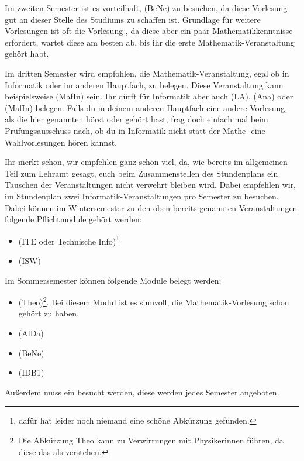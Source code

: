 Im zweiten Semester ist es vorteilhaft,  (\gls{BeNe}) zu besuchen, da diese Vorlesung gut an dieser Stelle des Studiums zu schaffen ist. Grundlage für weitere Vorlesungen ist oft die Vorlesung , da diese aber ein paar Mathematikkenntnisse erfordert, wartet diese am besten ab, bis ihr die erste Mathematik-Veranstaltung gehört habt.

Im dritten Semester wird empfohlen, die Mathematik-Veranstaltung, egal ob in Informatik oder im anderen Hauptfach, zu belegen. Diese Veranstaltung kann beispielsweise  (\gls{MafIn}) sein. Ihr dürft für Informatik aber auch  (\gls{LA}), (\gls{Ana}) oder  (\gls{MafIn}) belegen. Falls du in deinem anderen Hauptfach eine andere Vorlesung, als die hier genannten hörst oder gehört hast, frag doch einfach mal beim Prüfungsausschuss nach, ob du in Informatik nicht statt der Mathe- eine Wahlvorlesungen hören kannst.

Ihr merkt schon, wir empfehlen ganz schön viel, da, wie bereits im allgemeinen Teil zum Lehramt gesagt, euch beim Zusammenstellen des Stundenplans ein Tauschen der Veranstaltungen nicht verwehrt bleiben wird. Dabei empfehlen wir, im Stundenplan zwei Informatik-Veranstaltungen pro Semester zu besuchen. Dabei können im Wintersemester zu den oben bereits genannten Veranstaltungen folgende Pflichtmodule gehört werden:
\begin{itemize}
    \item {} (\gls{ITE} oder Technische Info)\footnote{dafür hat leider noch niemand eine schöne Abkürzung gefunden.}
    \item {} (\gls{ISW})
\end{itemize}
Im Sommersemester können folgende Module belegt werden:
\begin{itemize}
    \item {} (\gls{Theo})\footnote{Die Abkürzung \glqq{}Theo\grqq{} kann zu Verwirrungen mit Physikerinnen führen, da diese das als  verstehen.}. Bei diesem Modul ist es sinnvoll, die Mathematik-Vorlesung schon gehört zu haben.
    \item {} (\gls{AlDa})
    \item {} (\gls{BeNe})
    \item {} (\gls{IDB1})
\end{itemize}
Außerdem muss ein  besucht werden, diese werden jedes Semester angeboten.

